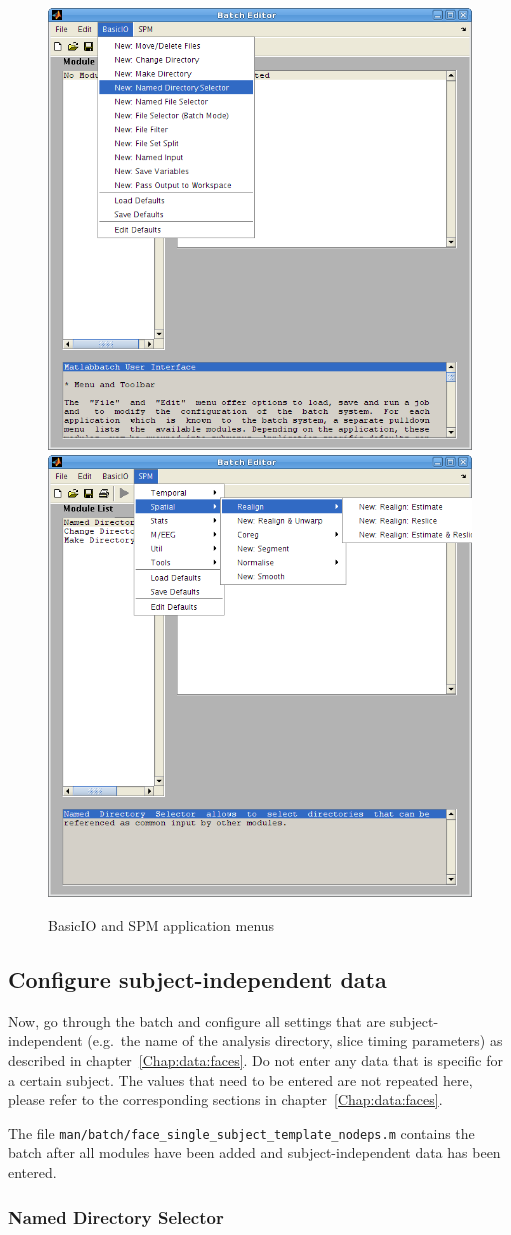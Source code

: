\begin{figure}
  \centering
  \includegraphics[width=.49\linewidth]{batch/batch_basicio}
  \hfill
  \includegraphics[width=.49\linewidth]{batch/batch_spm}      
  \caption{BasicIO and SPM application menus}
  \label{fig:basicio_spm}
\end{figure}

\subsection{Configure subject-independent data}

Now, go through the batch and configure all settings that are
subject-independent (e.g.\ the name of the analysis directory, slice timing
parameters) as described in chapter~\ref{Chap:data:faces}. Do not enter any data that
is specific for a certain subject. The values that need to be entered are not
repeated here, please refer to the corresponding sections in
chapter~\ref{Chap:data:faces}.

The file \verb|man/batch/face_single_subject_template_nodeps.m| contains the
batch after all modules have been added and subject-independent data has been
entered.

\subsubsection*{Named Directory Selector}

